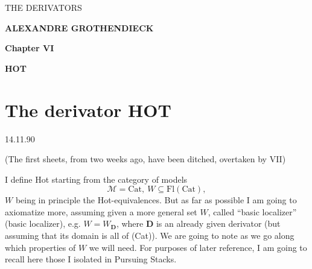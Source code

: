 \begin{center}

\vspace*{6cm}

{\Large\textsf{THE DERIVATORS}}

\bigskip

\textbf{ALEXANDRE GROTHENDIECK}

\vspace{2cm}

\textbf{Chapter VI}

\medskip

\textbf{HOT}
\end{center}

\clearpage

\vspace*{6cm}

\noindent{}%

\clearpage

\noindent{}

\section*{\normalsize The derivator \textmd{HOT}}

\begin{flushright}
14.11.90
\end{flushright}

\begin{flushright}
(The first sheets, from two weeks ago, have been ditched, overtaken by VII)
\end{flushright}

\noindent I define Hot starting from the category of models
\[
\mathcal{M} = \mathrm{Cat},\ W \subseteq \mathrm{Fl}(\mathrm{Cat}),
\]
$W$ being in principle the Hot-equivalences. But as far as possible I am going to axiomatize more, assuming given a more general set $W$, called ``basic localizer'' (basic localizer), e.g. $W = W_{\mathbf{D}}$, where $\mathbf{D}$ is an already given derivator (but assuming that its domain is all of (Cat)). We are going to note as we go along which properties of $W$ we will need. For purposes of later reference, I am going to recall here those I isolated in Pursuing Stacks.

